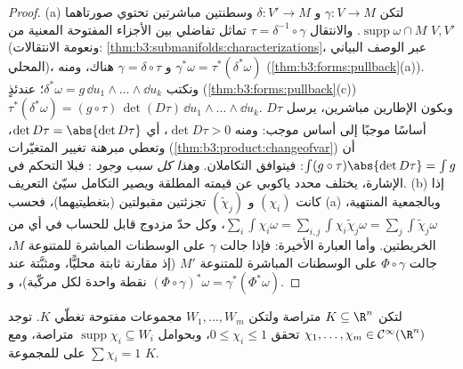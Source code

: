 \begin{proof}
(a) لتكن $\gamma\colon V \to M$ و $\delta\colon V' \to M$ وسطنتين مباشرتين تحتوي صورتاهما
$\operatorname{supp}\omega\cap M$. والانتقال $\tau =
\delta^{-1}\circ\gamma$ تماثل تفاضلي بين الأجزاء المفتوحة
المعنية من $V, V'$ (ونعومة الانتقالات: \cref{thm:b3:submanifolds:characterizations}، عبر الوصف
البياني المحلي)، و $\gamma = \delta\circ\tau$ هناك، ومنه
$\gamma^*\omega = \tau^*(\delta^*\omega)$
(\cref{thm:b3:forms:pullback}(a)). ونكتب $\delta^*\omega =
g\,\dd u_1\wedge\dots\wedge\dd u_k$؛ عندئذٍ (\cref{thm:b3:forms:pullback}(c))
$\tau^*(\delta^*\omega) =
(g\circ\tau)\,\det(D\tau)\,\dd u_1\wedge\dots\wedge\dd u_k$. وبكون الإطارين مباشرين، يرسل $D\tau$ أساسًا موجبًا إلى
أساس موجب: ومنه $\det D\tau > 0$، أي $\det D\tau =
\abs{\det D\tau}$، وتعطي مبرهنة
تغيير المتغيّرات (\cref{thm:b3:product:changeofvar}) أن $\int(g\circ\tau)\abs{\det D\tau} = \int g$: فيتوافق التكاملان.
\emph{وهذا كل سبب وجود }: فبلا التحكم في الإشارة، يختلف
محدد ياكوبي عن قيمته المطلقة ويصير التكامل سيّئ التعريف.
(b) إذا كانت $(\chi_i)$ و $(\tilde\chi_j)$ تجزئتين مقبولتين
(بتغطيتيهما)، فحسب (a) وبالجمعية المنتهية، $\sum_i\int\chi_i\omega =
\sum_{i,j}\int\chi_i\tilde\chi_j\omega =
\sum_j\int\tilde\chi_j\omega$، وكل حدّ
مزدوج قابل للحساب في أي من الخريطتين. وأما العبارة الأخيرة:
فإذا جالت $\gamma$ على الوسطنات المباشرة للمتنوعة $M$، جالت
$\Phi\circ\gamma$ على الوسطنات المباشرة للمتنوعة $M'$ (إذ مقارنة 
ثابتة محليًّا، ومثبَّتة عند نقطة واحدة لكل مركّبة)، و $(\Phi\circ\gamma)^*\omega =
\gamma^*(\Phi^*\omega)$.
\end{proof}

\begin{lemma}
\label{lem:b3:forms:partition}
لتكن $K \subseteq \R^n$ متراصة ولتكن $W_1, \dots, W_m$ مجموعات مفتوحة تغطّي $K$.
توجد $\chi_1, \dots, \chi_m \in
\mathcal C^\infty(\R^n)$ تحقق $0 \leq \chi_i \leq 1$، وبحوامل $\operatorname{supp}\chi_i \subseteq W_i$ متراصة، ومع
$\sum\chi_i = 1$ على  للمجموعة $K$.
\end{lemma}


